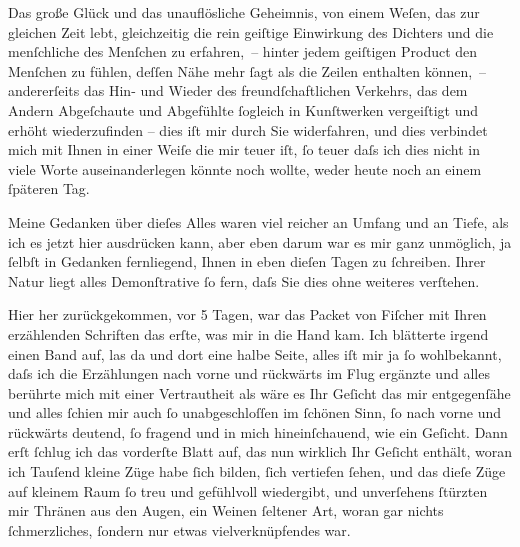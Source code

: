 \pstart
           {\pb}Das große Glück und das unauflösliche Geheimnis, von
               einem Weſen, das zur gleichen Zeit lebt, gleichzeitig die rein geiſtige Einwirkung
               des Dichters und die menſchliche des Menſchen zu erfahren, – hinter jedem geiſtigen
               Product den Menſchen zu fühlen, deſſen Nähe mehr{ }ſagt als die Zeilen enthalten
               können, – andererſeits das Hin- und Wieder des freundſchaftlichen Verkehrs, das dem
               Andern Abgeſchaute und Abgefühlte{ }ſogleich in Kunſtwerken vergeiſtigt und erhöht
               wiederzufinden – dies iſt mir durch Sie widerfahren, und dies verbindet mich mit
               Ihnen in einer Weiſe die mir teuer iſt,{ }ſo teuer daſs ich dies nicht in viele Worte
               auseinanderlegen könnte noch wollte, weder heute noch an einem{ }ſpäteren Tag.\pend
           
\pstart
           Meine Gedanken über dieſes Alles waren viel reicher an Umfang und an Tiefe, als ich
               es jetzt hier ausdrücken kann, aber eben darum war es mir ganz {\pb}unmöglich, ja{ }ſelbſt in Gedanken fernliegend, Ihnen in
               eben dieſen Tagen zu{ }ſchreiben. Ihrer Natur liegt alles Demonſtrative{ }ſo fern, daſs
               Sie dies ohne weiteres verſtehen.\pend
           
\pstart
           Hier her zurückgekommen, vor 5 Tagen, war das Packet von Fiſcher mit Ihren erzählenden
                  Schriften das erſte, was mir in die Hand kam. Ich blätterte irgend einen Band
               auf, las da und dort eine halbe Seite, alles iſt mir ja{ }ſo wohlbekannt, daſs ich die
               Erzählungen nach vorne und rückwärts im Flug ergänzte und alles berührte mich mit
               einer Vertrautheit als wäre es Ihr Geſicht das mir entgegenſähe und alles{ }ſchien mir
               auch{ }ſo unabgeschloſſen im{ }ſchönen Sinn,{ }ſo nach vorne und rückwärts deutend,{ }ſo
               fragend und in mich hineinſchauend, wie ein Geſicht. Dann erſt{ }ſchlug ich das
               vorderſte Blatt auf, das nun wirklich Ihr Geſicht enthält, woran ich Tauſend kleine Züge habe{ }ſich
               bilden,{ }ſich vertiefen{ }ſehen, und das dieſe Züge auf kleinem Raum{ }ſo treu und
               gefühlvoll wiedergibt, und unverſehens{ }ſtürzten mir {\pb}Thränen aus den Augen, ein Weinen{ }ſeltener Art, woran gar nichts{ }ſchmerzliches,{ }ſondern nur etwas vielverknüpfendes war.\pend
           
